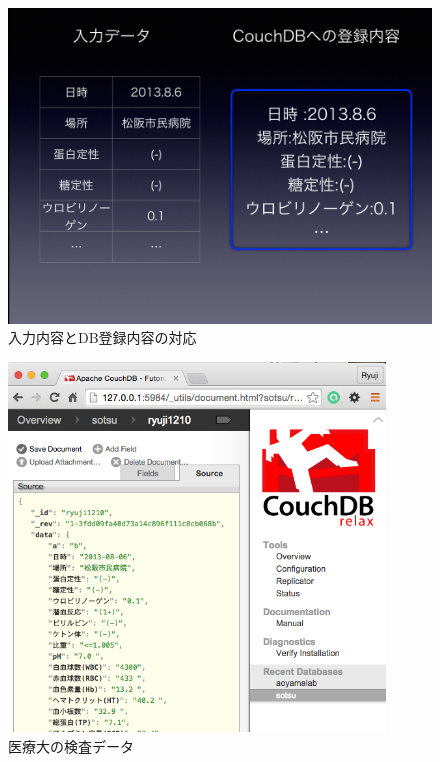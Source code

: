 			\begin{figure}[htbp]
				\begin{center}
					\includegraphics[width=15cm, bb=0 0 1435 1073, clip]{./gazou/csv-data-trans2.png}
				\end{center}
				\caption{入力内容とDB登録内容の対応}
				\label{csv-data-trans}
			\end{figure}

			\begin{figure}[htbp]
				\begin{center}
					\includegraphics[width=10cm, bb=0 0 581 571, clip]{./gazou/kensa-data.png}
				\end{center}
				\caption{医療大の検査データ}
				\label{iryoudai-kensa-data}
			\end{figure}


